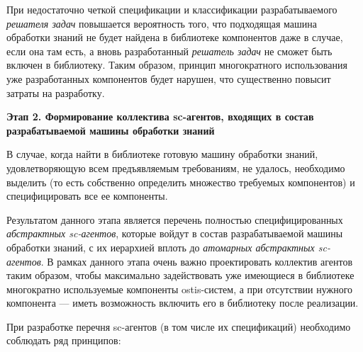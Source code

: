 При недостаточно четкой спецификации и классификации разрабатываемого \textit{решателя задач} повышается вероятность того, что подходящая машина обработки знаний не будет найдена в библиотеке компонентов даже в случае, если она там есть, а вновь разработанный \textit{решатель задач} не сможет быть включен в библиотеку. Таким образом, принцип многократного использования уже разработанных компонентов будет нарушен, что существенно повысит затраты на разработку.

\textbf{Этап 2. Формирование коллектива sc-агентов, входящих в состав разрабатываемой машины обработки знаний}

В случае, когда найти в библиотеке готовую машину обработки знаний, удовлетворяющую всем предъявляемым требованиям, не удалось, необходимо выделить (то есть собственно определить множество требуемых компонентов) и специфицировать все ее компоненты.

Результатом данного этапа является перечень полностью специфицированных \textit{абстрактных sc-агентов}, которые войдут в состав разрабатываемой машины обработки знаний, с их иерархией вплоть до \textit{атомарных абстрактных sc-агентов}. В рамках данного этапа очень важно проектировать коллектив агентов таким образом, чтобы максимально задействовать уже имеющиеся в библиотеке многократно используемые компоненты ostis-систем, а при отсутствии нужного компонента --- иметь возможность включить его в библиотеку после реализации.

При разработке перечня sc-агентов (в том числе их спецификаций) необходимо соблюдать ряд принципов:

